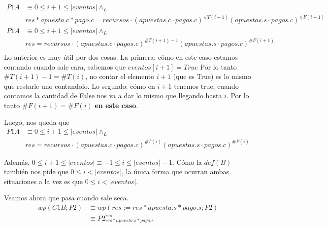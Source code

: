 \documentclass[../document.tex]{subfiles}
\begin{document}
\begin{equation} \label{eq2.a}
\begin{split}
P1A & \equiv 0\leq i+1 \leq |eventos| \land_L \\& res * apuesta.c * pago.c = recursos \cdot (apuestas.c\cdot pagos.c)^{\#T(i+1)}(apuestas.s\cdot pagos.c)^{\#F(i+1)}\\
P1A & \equiv 0\leq i+1 \leq |eventos| \land_L \\& res = recursos \cdot (apuestas.c\cdot pagos.c)^{\#T(i+1)-1}(apuestas.s\cdot pagos.c)^{\#F(i+1)}\\
\end{split}
\end{equation}
Lo anterior es muy útil por dos cosas.
La primera: cómo en este caso estamos contando cuando sale cara, sabemos que $eventos[i+1] = True$ Por lo tanto $\#T(i+1)-1=\#T(i)$, no contar el elemento $i+1$ (que es True) es lo mismo que restarle uno contandolo. Lo segundo: cómo en $i+1$ tenemos true, cuando contamos la cantidad de False nos va a dar lo mismo que llegando hasta $i$. Por lo tanto $\#F(i+1)=\#F(i)$ \textbf{en este caso}.

Luego, nos queda que
\begin{equation} 
    \begin{split}
    P1A & \equiv 0\leq i+1 \leq |eventos| \land_L \\& res = recursos \cdot (apuestas.c\cdot pagos.c)^{\#T(i)}(apuestas.s\cdot pagos.c)^{\#F(i)}
    \end{split}
\end{equation}

Además, $0\leq i+1 \leq |eventos| \equiv -1\leq i \leq |eventos|-1$. Cómo la $def(B)$ también nos pide que $0 \leq i < |eventos|$, la única forma que ocurran ambas situaciones a la vez es que $0\leq i < |eventos|$.

Veamos ahora que pasa cuando sale seca.
\begin{equation} \label{eq2.a}
\begin{split}
wp(C1B;P2) & \equiv wp(res := res * apuesta.s * pago.s; P2) \\
           & \equiv P2^{res}_{res * apuesta.s * pago.s} \\
\end{split}
\end{equation}
\end{document}
